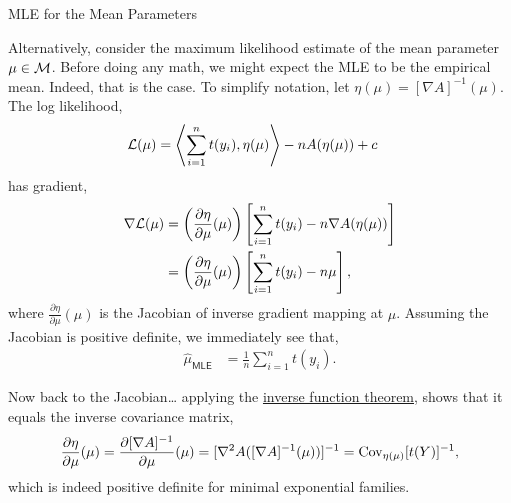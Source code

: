 \documentclass[aspectratio=169]{beamer}
\begin{document}
\begin{frame}[t,allowframebreaks]{MLE for the Mean
Parameters}\label{mle-for-the-mean-parameters}

Alternatively, consider the maximum likelihood estimate of the mean
parameter \(\mu \in \mathcal{M}\). Before doing any math, we might expect the
MLE to be the empirical mean. Indeed, that is the case. To simplify
notation, let \(\eta(\mu) = [\nabla A]^{-1}(\mu)\). The log likelihood,
\begin{align*}
\mathcal{L}(\mu)
&= \left \langle \sum_{i=1}^n t(y_i), \eta(\mu) \right \rangle - n A(\eta(\mu)) + c
\end{align*} has gradient, \begin{align*}
\nabla \mathcal{L}(\mu)
&= \left(\frac{\partial \eta}{\partial \mu}(\mu) \right) \left[\sum_{i=1}^n t(y_i) - n \nabla A(\eta(\mu))\right] \\
&= \left(\frac{\partial \eta}{\partial \mu}(\mu) \right) \left[\sum_{i=1}^n t(y_i) - n \mu \right],
\end{align*} where \(\tfrac{\partial \eta}{\partial \mu}(\mu)\) is the
Jacobian of inverse gradient mapping at \(\mu\). Assuming the Jacobian
is positive definite, we immediately see that, \begin{align*}
\hat{\mu}_{\mathsf{MLE}} &= \frac{1}{n} \sum_{i=1}^n t(y_i).
\end{align*}

Now back to the Jacobian\ldots{} applying the
\href{https://en.wikipedia.org/wiki/Inverse_function_theorem}{inverse
function theorem}, shows that it equals the inverse covariance matrix,
\begin{align*}
\frac{\partial \eta}{\partial \mu} (\mu) 
= \frac{\partial [\nabla A]^{-1}}{\partial \mu} (\mu)
= [\nabla^2 A ([\nabla A]^{-1}(\mu))]^{-1} 
= \textrm{Cov}_{\eta(\mu)}[t(Y)]^{-1},
\end{align*} which is indeed positive definite for minimal exponential
families.
\end{frame}
\end{document}
